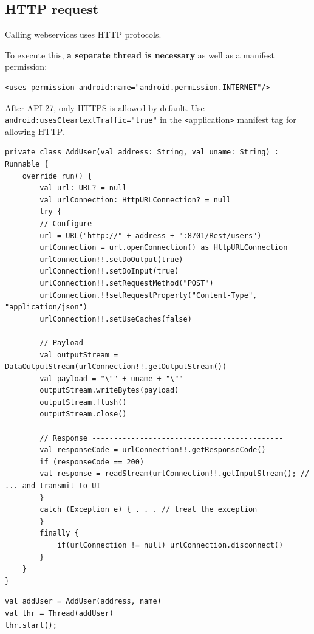 \subsection{HTTP request}
Calling webservices uses HTTP protocols. 

To execute this, \textbf{a separate thread is necessary} as well as a manifest permission:

\begin{lstlisting}
<uses-permission android:name="android.permission.INTERNET"/>
\end{lstlisting}

After API 27, only HTTPS is allowed by default. Use \texttt{android:usesCleartextTraffic="true"}  in the 
\texttt{<}application\texttt{>} manifest tag for allowing HTTP. 

\begin{lstlisting}[title=Using HttpURLConnection]
private class AddUser(val address: String, val uname: String) : Runnable {
    override run() {
        val url: URL? = null
        val urlConnection: HttpURLConnection? = null
        try {
        // Configure -------------------------------------------
        url = URL("http://" + address + ":8701/Rest/users")
        urlConnection = url.openConnection() as HttpURLConnection
        urlConnection!!.setDoOutput(true)
        urlConnection!!.setDoInput(true)
        urlConnection!!.setRequestMethod("POST")
        urlConnection.!!setRequestProperty("Content-Type", "application/json")
        urlConnection!!.setUseCaches(false)

        // Payload ---------------------------------------------
        val outputStream = DataOutputStream(urlConnection!!.getOutputStream())
        val payload = "\"" + uname + "\""
        outputStream.writeBytes(payload)
        outputStream.flush()
        outputStream.close()

        // Response --------------------------------------------
        val responseCode = urlConnection!!.getResponseCode()
        if (responseCode == 200)
        val response = readStream(urlConnection!!.getInputStream(); // ... and transmit to UI
        }
        catch (Exception e) { . . . // treat the exception
        }
        finally {
            if(urlConnection != null) urlConnection.disconnect()
        }
    }
}
\end{lstlisting}

\begin{lstlisting}[title=Using threads to invoke]
val addUser = AddUser(address, name)
val thr = Thread(addUser)
thr.start();
\end{lstlisting}

